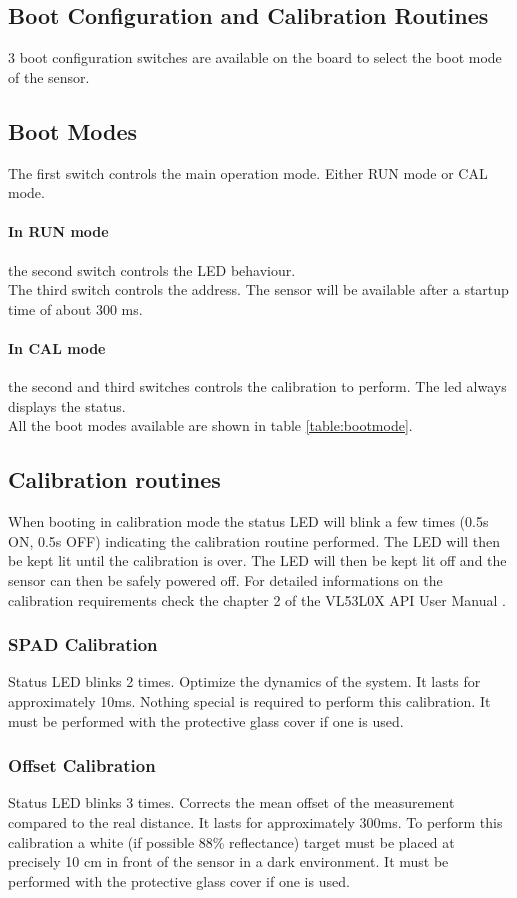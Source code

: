\begin{multicols}{2}
\section{Boot Configuration and Calibration Routines}
3 boot configuration switches are available on the board to select the boot mode of the sensor.
\subsection{Boot Modes} \label{sec:BootModes}
The first switch controls the main operation mode. Either RUN mode or CAL mode.
\paragraph{In RUN mode} the second switch controls the LED behaviour.\\
The third switch controls the \iic address. The sensor will be available after a startup time of about 300 ms.
\paragraph{In CAL mode} the second and third switches controls the calibration to perform. The led always displays the status.\\
All the boot modes available are shown in table \ref{table:bootmode}.

\subsection{Calibration routines}
When booting in calibration mode the status LED will blink a few times (0.5s ON, 0.5s OFF) indicating the calibration routine performed. The LED will then be kept lit until the calibration is over. The LED will then be kept lit off and the sensor can then be safely powered off. For detailed informations on the calibration requirements check the chapter 2 of the VL53L0X API User Manual \cite{tofAPI}.

\subsubsection{SPAD Calibration}
Status LED blinks 2 times. Optimize the dynamics of the system. It lasts for approximately 10ms. Nothing special is required to perform this calibration. It must be performed with the protective glass cover if one is used.

\subsubsection{Offset Calibration}
Status LED blinks 3 times. Corrects the mean offset of the measurement compared to the real distance. It lasts for approximately 300ms. To perform this calibration a white (if possible 88\% reflectance) target must be placed at precisely 10 cm in front of the sensor in a dark environment. It must be performed with the protective glass cover if one is used.


\end{multicols}
